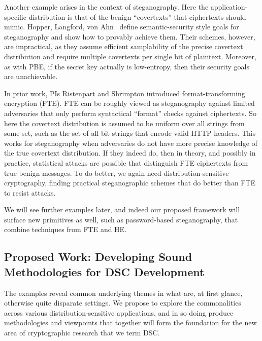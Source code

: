 Another example arises in the context of steganography. Here the
application-specific distribution is that of the benign ``covertexts'' that
ciphertexts should mimic. Hopper, Langford, von Ahn~\cite{Hopper:Provable_Stego}
define semantic-security style goals for steganography and show how to provably
achieve them. Their schemes, however, are impractical, as they assume efficient
samplability of the precise covertext distribution and require multiple
covertexts per single bit of plaintext. Moreover, as with PBE, if the secret key
actually is low-entropy, then their security goals are unachievable. 

In prior work, PIs Ristenpart and Shrimpton introduced format-transforming
encryption (FTE). FTE can be roughly viewed as steganography against limited
adversaries that only perform syntactical ``format'' checks against ciphertexts.
So here the covertext distribution is assumed to be uniform over all strings
from some set, such as the set of all bit strings that encode valid HTTP
headers. This works for steganography when adversaries do not have more precise knowledge
of the true covertext distribution. If they indeed do, then in theory, and possibly in practice, statistical attacks are possible that
distinguish FTE ciphertexts from true benign messages. To do better, we again need
distribution-sensitive cryptography, finding practical steganographic schemes
that do better than FTE to resist attacks. 

We will see further examples later, and indeed our proposed framework will
surface new primitives as well, such as password-based steganography, that
combine techniques from FTE and HE. 

\subsection{Proposed Work: Developing Sound Methodologies for DSC Development}

The examples reveal common underlying themes in what are, at first glance,
otherwise quite disparate settings. We propose to explore the commonalities
across various distribution-sensitive applications, and in so doing produce
methodologies and viewpoints that together will form the foundation for the 
new area of cryptographic research that we term DSC. 

\fi


